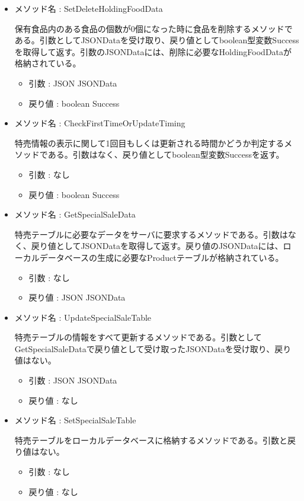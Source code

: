 \documentclass[a4j]{jarticle}
\begin{document}
\begin{itemize}
	\item メソッド名 : SetDeleteHoldingFoodData

	保有食品内のある食品の個数が0個になった時に食品を削除するメソッドである。引数としてJSONDataを受け取り、戻り値としてboolean型変数Successを取得して返す。引数のJSONDataには、削除に必要なHoldingFoodDataが格納されている。
	\begin{itemize}
		\item 引数 : JSON JSONData
		\item 戻り値 : boolean Success
	\end{itemize}

	\item メソッド名 : CheckFirstTimeOrUpdateTiming

	特売情報の表示に関して1回目もしくは更新される時間かどうか判定するメソッドである。引数はなく、戻り値としてboolean型変数Successを返す。
	\begin{itemize}
		\item 引数 : なし
		\item 戻り値 : boolean Success
	\end{itemize}

	\item メソッド名 : GetSpecialSaleData

	特売テーブルに必要なデータをサーバに要求するメソッドである。引数はなく、戻り値としてJSONDataを取得して返す。戻り値のJSONDataには、ローカルデータベースの生成に必要なProductテーブルが格納されている。
	\begin{itemize}
		\item 引数 : なし
		\item 戻り値 : JSON JSONData
	\end{itemize}

	\item メソッド名 : UpdateSpecialSaleTable

	特売テーブルの情報をすべて更新するメソッドである。引数としてGetSpecialSaleDataで戻り値として受け取ったJSONDataを受け取り、戻り値はない。
     \begin{itemize}
		\item 引数 : JSON JSONData
		\item 戻り値 : なし
	\end{itemize}

	\item メソッド名 : SetSpecialSaleTable

	特売テーブルをローカルデータベースに格納するメソッドである。引数と戻り値はない。
	\begin{itemize}
		\item 引数 : なし
		\item 戻り値 : なし
	\end{itemize}


\end{itemize}
\end{document}
